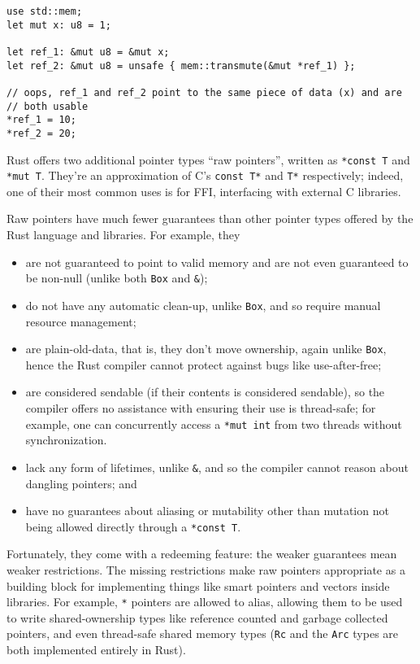 \documentclass[]{article}
\begin{document}
\begin{verbatim}
use std::mem;
let mut x: u8 = 1;

let ref_1: &mut u8 = &mut x;
let ref_2: &mut u8 = unsafe { mem::transmute(&mut *ref_1) };

// oops, ref_1 and ref_2 point to the same piece of data (x) and are
// both usable
*ref_1 = 10;
*ref_2 = 20;
\end{verbatim}


Rust offers two additional pointer types ``raw pointers'', written as
\texttt{*const T} and \texttt{*mut T}. They're an approximation of C's
\texttt{const T*} and \texttt{T*} respectively; indeed, one of their
most common uses is for FFI, interfacing with external C libraries.

Raw pointers have much fewer guarantees than other pointer types offered
by the Rust language and libraries. For example, they

\begin{itemize}
\itemsep1pt\parskip0pt
\item
  are not guaranteed to point to valid memory and are not even
  guaranteed to be non-null (unlike both \texttt{Box} and \texttt{\&});
\item
  do not have any automatic clean-up, unlike \texttt{Box}, and so
  require manual resource management;
\item
  are plain-old-data, that is, they don't move ownership, again unlike
  \texttt{Box}, hence the Rust compiler cannot protect against bugs like
  use-after-free;
\item
  are considered sendable (if their contents is considered sendable), so
  the compiler offers no assistance with ensuring their use is
  thread-safe; for example, one can concurrently access a
  \texttt{*mut int} from two threads without synchronization.
\item
  lack any form of lifetimes, unlike \texttt{\&}, and so the compiler
  cannot reason about dangling pointers; and
\item
  have no guarantees about aliasing or mutability other than mutation
  not being allowed directly through a \texttt{*const T}.
\end{itemize}

Fortunately, they come with a redeeming feature: the weaker guarantees
mean weaker restrictions. The missing restrictions make raw pointers
appropriate as a building block for implementing things like smart
pointers and vectors inside libraries. For example, \texttt{*} pointers
are allowed to alias, allowing them to be used to write shared-ownership
types like reference counted and garbage collected pointers, and even
thread-safe shared memory types (\texttt{Rc} and the \texttt{Arc} types
are both implemented entirely in Rust).
\end{document}

